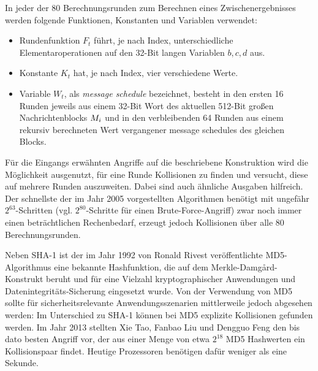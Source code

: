 In jeder der 80 Berechnungsrunden zum Berechnen eines Zwischenergebnisses werden folgende Funktionen, Konstanten und Variablen verwendet:
\begin{itemize}
	\item Rundenfunktion $F_{t}$ führt, je nach Index, unterschiedliche Elementaroperationen auf den 32-Bit langen Variablen $b, c, d$ aus.
	\item Konstante $K_{t}$ hat, je nach Index, vier verschiedene Werte.
	\item Variable $W_{t}$, als \emph{message schedule} bezeichnet, besteht in den ersten 16 Runden jeweils aus einem 32-Bit Wort des aktuellen 512-Bit großen Nachrichtenblocks $M_{i}$ und in den verbleibenden 64 Runden aus einem rekursiv berechneten Wert vergangener message schedules des gleichen Blocks.
\end{itemize}

Für die Eingangs erwähnten Angriffe auf die beschriebene Konstruktion wird die Möglichkeit ausgenutzt, für eine Runde Kollisionen zu finden und versucht, diese auf mehrere Runden auszuweiten. Dabei sind auch ähnliche Ausgaben hilfreich. Der schnellste der im Jahr 2005 vorgestellten Algorithmen benötigt mit ungefähr $2^{63}$-Schritten (vgl. $2^{80}$-Schritte für einen Brute-Force-Angriff) zwar noch immer einen beträchtlichen Rechenbedarf, erzeugt jedoch Kollisionen über alle 80 Berechnungsrunden.

Neben SHA-1 ist der im Jahr 1992 von Ronald Rivest veröffentlichte MD5-Algorithmus \indexMDFive eine bekannte Hashfunktion, die auf dem Merkle-Damgård-Konstrukt beruht und für eine Vielzahl kryptographischer Anwendungen und Datenintegritäts-Sicherung eingesetzt wurde. Von der Verwendung von MD5 sollte für sicherheitsrelevante Anwendungsszenarien mittlerweile jedoch abgesehen werden: Im Unterschied zu SHA-1 können bei MD5 explizite Kollisionen gefunden werden. Im Jahr 2013 stellten Xie Tao, Fanbao Liu und Dengguo Feng den bis dato besten Angriff vor, der aus einer Menge von etwa $2^{18}$ MD5 Hashwerten ein Kollisionspaar findet. Heutige Prozessoren benötigen dafür weniger als eine Sekunde.

